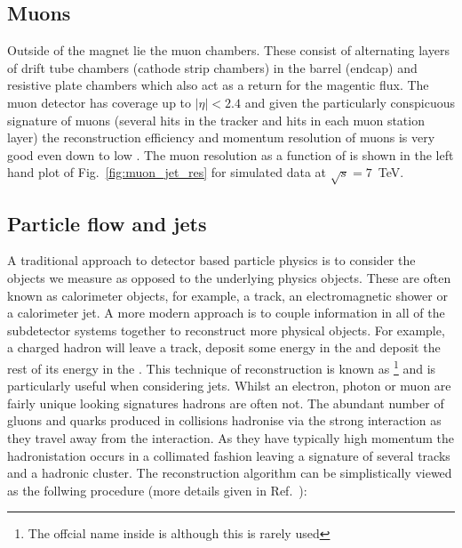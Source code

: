 \subsection{Muons}
\label{sec:muons}
Outside of the magnet lie the \CMS muon chambers. These consist of alternating layers of drift tube chambers (cathode strip chambers) in the barrel (endcap) and resistive plate chambers which also act as a return for the magentic flux. The muon detector has coverage up to $|\eta|<2.4$ and given the particularly conspicuous signature of muons (several hits in the tracker and hits in each muon station layer) the reconstruction efficiency and momentum resolution of muons is very good even down to low \pT. The muon resolution as a function of \pT is shown in the left hand plot of Fig.~\ref{fig:muon_jet_res} for simulated data at $\sqrt{s}=7$~TeV.

\subsection{Particle flow and jets}
\label{sec:pflow_jets}
A traditional approach to detector based particle physics is to consider the objects we measure as opposed to the underlying physics objects. These are often known as calorimeter objects, for example, a track, an electromagnetic shower or a calorimeter jet. A more modern approach is to couple information in all of the subdetector systems together to reconstruct more physical objects. For example, a charged hadron will leave a track, deposit some energy in the \ECAL and deposit the rest of its energy in the \HCAL. This technique of reconstruction is known as \PF\footnote{The offcial name inside \CMS is \GED although this is rarely used} and is particularly useful when considering jets. Whilst an electron, photon or muon are fairly unique looking signatures hadrons are often not. The abundant number of gluons and quarks produced in \LHC collisions hadronise via the strong interaction as they travel away from the interaction. As they have typically high momentum the hadronistation occurs in a collimated fashion leaving a signature of several tracks and a hadronic cluster. The \PF reconstruction algorithm can be simplistically viewed as the follwing procedure (more details given in Ref.~\cite{cms_pf_algo}):

